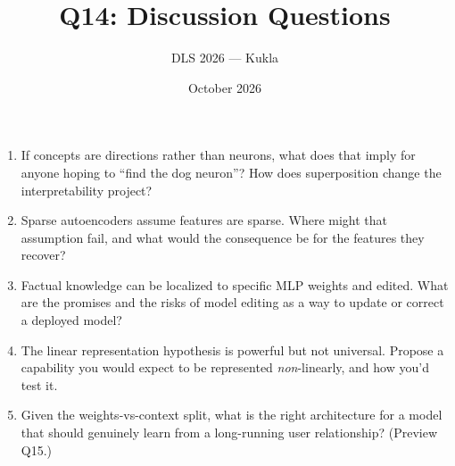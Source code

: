 \documentclass[11pt]{article}
\title{Q14: Discussion Questions}
\author{DLS 2026 --- Kukla}
\date{October 2026}
\begin{document}
\maketitle
\begin{enumerate}[leftmargin=1.5em]
\item If concepts are directions rather than neurons, what does that imply for anyone hoping to ``find the dog neuron''? How does superposition change the interpretability project?
\item Sparse autoencoders assume features are sparse. Where might that assumption fail, and what would the consequence be for the features they recover?
\item Factual knowledge can be localized to specific MLP weights and edited. What are the promises and the risks of model editing as a way to update or correct a deployed model?
\item The linear representation hypothesis is powerful but not universal. Propose a capability you would expect to be represented \emph{non}-linearly, and how you'd test it.
\item Given the weights-vs-context split, what is the right architecture for a model that should genuinely learn from a long-running user relationship? (Preview Q15.)
\end{enumerate}
\end{document}

